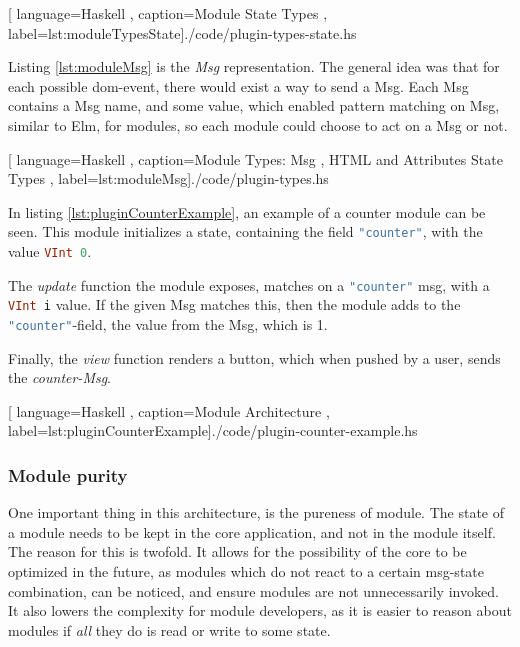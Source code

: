 \begin{center}
  
    [ language=Haskell
    , caption={Module State Types}
    , label=lst:moduleTypesState]{./code/plugin-types-state.hs}
\end{center}

Listing \ref{lst:moduleMsg} is the \textit{Msg} representation. The general idea
was that for each possible \gls{dom}-event, there would exist a way to send a
Msg. Each Msg contains a Msg name, and some value, which enabled pattern
matching on Msg, similar to Elm, for modules, so each module could choose to act
on a Msg or not.


\begin{center}
  \centering
  
    [ language=Haskell
    , caption={Module Types: Msg
    , HTML and Attributes State Types}
    , label=lst:moduleMsg]{./code/plugin-types.hs}
\end{center}

In listing \ref{lst:pluginCounterExample}, an example of a counter module can be
seen. This module initializes a state, containing the field
\lstinline[language=Haskell]{"counter"}, with the value
\lstinline[language=Haskell]{VInt 0}.

The \textit{update} function the module exposes, matches on a
\lstinline[language=Haskell]{"counter"} msg, with a
\lstinline[language=Haskell]{VInt i} value. If the given Msg matches this, then
the module adds to the \lstinline[language=Haskell]{"counter"}-field, the value
from the Msg, which is 1.

Finally, the \textit{view} function renders a button, which when pushed by a
user, sends the \textit{counter-Msg}.

\begin{center}
  
    [ language=Haskell
    , caption={Module Architecture}
    , label=lst:pluginCounterExample]{./code/plugin-counter-example.hs}
\end{center}

\subsubsection{Module purity}

One important thing in this architecture, is the pureness of module. The state
of a module needs to be kept in the core application, and not in the module
itself. The reason for this is twofold. It allows for the possibility of the
core to be optimized in the future, as modules which do not react to a certain
msg-state combination, can be noticed, and ensure modules are not unnecessarily
invoked. It also lowers the complexity for module developers, as it is easier to
reason about modules if \textit{all} they do is read or write to some state.

